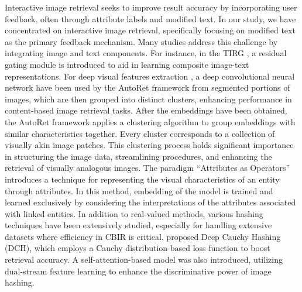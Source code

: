 \documentclass[10pt,lineno]{wlpeerj}
\begin{document}
Interactive image retrieval seeks to improve result accuracy by incorporating user feedback, often through attribute labels and modified text. In our study, we have concentrated on interactive image retrieval, specifically focusing on modified text as the primary feedback mechanism. Many studies address this challenge by integrating image and text components. For instance, in the TIRG \citep{Nam}, a residual gating module is introduced to aid in learning composite image-text representations. For deep visual features extraction , a deep convolutional neural network have been used by the AutoRet\citep{AutoRet1} framework from segmented portions of images, which are then grouped into distinct clusters, enhancing performance in content-based image retrieval tasks. After the embeddings have been obtained, the AutoRet framework applies a clustering algorithm to group embeddings with similar characteristics together. Every cluster corresponds to a collection of visually akin image patches. This clustering process holds significant importance in structuring the image data, streamlining procedures, and enhancing the retrieval of visually analogous images. The paradigm  “Attributes as Operators” \citep{Attributes_as_operators} introduces a technique for representing the visual characteristics of an entity through attributes. In this method, embedding of the model is trained and learned exclusively by considering the interpretations of the attributes associated with linked entities. In addition to real-valued methods, various hashing techniques have been extensively studied, especially for handling extensive datasets where efficiency in CBIR is critical. \cite{Deep_Hashing} proposed Deep Cauchy Hashing (DCH), which employs a Cauchy distribution-based loss function to boost retrieval accuracy. A self-attention-based model \cite{Transformer_Hashing} was also introduced, utilizing dual-stream feature learning to enhance the discriminative power of image hashing.
\end{document}

